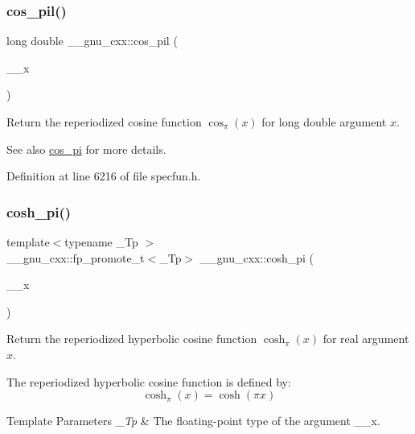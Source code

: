 \subsubsection{\texorpdfstring{cos\+\_\+pil()}{cos\_pil()}}
{\footnotesize\ttfamily long double \+\_\+\+\_\+gnu\+\_\+cxx\+::cos\+\_\+pil (\begin{DoxyParamCaption}\item[{long double}]{\+\_\+\+\_\+x }\end{DoxyParamCaption})\hspace{0.3cm}{\ttfamily [inline]}}

Return the reperiodized cosine function $ \cos_\pi(x) $ for {\ttfamily long double} argument $ x $.

\begin{DoxySeeAlso}{See also}
\hyperlink{group__gnu__math__spec__func_gafc4698ae591b0e9e61285b0794d43ef4}{cos\+\_\+pi} for more details. 
\end{DoxySeeAlso}


Definition at line 6216 of file specfun.\+h.

\mbox{\label{group__gnu__math__spec__func_gaf59c68a01adfdab0f22c4fb405ab2a36}} 
\subsubsection{\texorpdfstring{cosh\+\_\+pi()}{cosh\_pi()}}
{\footnotesize\ttfamily template$<$typename \+\_\+\+Tp $>$ \\
\+\_\+\+\_\+gnu\+\_\+cxx\+::fp\+\_\+promote\+\_\+t$<$\+\_\+\+Tp$>$ \+\_\+\+\_\+gnu\+\_\+cxx\+::cosh\+\_\+pi (\begin{DoxyParamCaption}\item[{\+\_\+\+Tp}]{\+\_\+\+\_\+x }\end{DoxyParamCaption})\hspace{0.3cm}{\ttfamily [inline]}}

Return the reperiodized hyperbolic cosine function $ \cosh_\pi(x) $ for real argument $ x $.

The reperiodized hyperbolic cosine function is defined by\+: \[ \cosh_\pi(x) = \cosh(\pi x) \]


\begin{DoxyTemplParams}{Template Parameters}
{\em \+\_\+\+Tp} & The floating-\/point type of the argument {\ttfamily \+\_\+\+\_\+x}. \\
\hline
\end{DoxyTemplParams}

